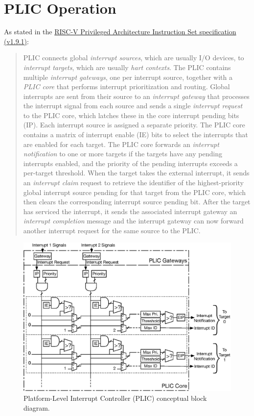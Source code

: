 \section{PLIC Operation}

As stated in the \href{https://github.com/riscv/riscv-isa-manual/blob/master/release/riscv-privileged-v1.9.1.pdf}{RISC-V Privileged Architecture Instruction Set specification (v1.9.1)}: 

\begin{quote}

PLIC connects global \emph{interrupt sources}, which are usually
I/O devices, to \emph{interrupt targets}, which are usually \emph{hart
  contexts}.  The PLIC contains multiple \emph{interrupt gateways}, one
per interrupt source, together with a \emph{PLIC core} that performs
interrupt prioritization and routing.  Global interrupts are sent from
their source to an \emph{interrupt gateway} that processes the
interrupt signal from each source and sends a single \emph{interrupt
  request} to the PLIC core, which latches these in the core interrupt
pending bits (IP).  Each interrupt source is assigned a separate
priority.  The PLIC core contains a matrix of interrupt enable (IE)
bits to select the interrupts that are enabled for each target.  The
PLIC core forwards an \emph{interrupt notification} to one or more
targets if the targets have any pending interrupts enabled, and the
priority of the pending interrupts exceeds a per-target threshold.
When the target takes the external interrupt, it sends an \emph{
  interrupt claim} request to retrieve the identifier of the
highest-priority global interrupt source pending for that target from
the PLIC core, which then clears the corresponding interrupt source
pending bit.  After the target has serviced the interrupt, it sends
the associated interrupt gateway an \emph{interrupt completion} message
and the interrupt gateway can now forward another interrupt request
for the same source to the PLIC.

\end{quote}  

\begin{figure}[tb]
\centering
\includegraphics[width=\textwidth]{assets/img/PLIC-block-diagram}
\caption{Platform-Level Interrupt Controller (PLIC) conceptual block diagram.}
\label{fig:plic-block-diagram}
\end{figure}

